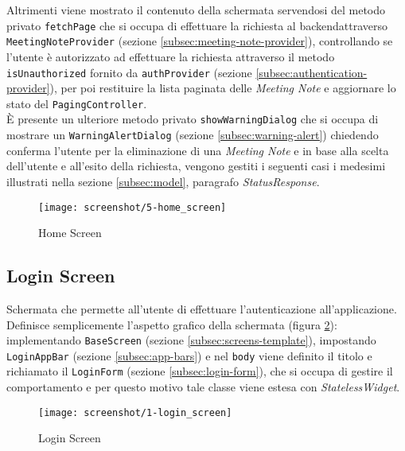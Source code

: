 Altrimenti viene mostrato il contenuto della schermata servendosi del metodo privato \lstinline{fetchPage} che si occupa di effettuare la richiesta al \gls{backend}\glsoccur attraverso \lstinline{MeetingNoteProvider} (sezione \ref{subsec:meeting-note-provider}), controllando se l'utente è autorizzato ad effettuare la richiesta attraverso il metodo \lstinline{isUnauthorized} fornito da \lstinline{authProvider} (sezione \ref{subsec:authentication-provider}), per poi restituire la lista paginata delle \emph{Meeting Note} e aggiornare lo stato del \lstinline{PagingController}. \\
È presente un ulteriore metodo privato \lstinline{showWarningDialog} che si occupa di mostrare un \lstinline{WarningAlertDialog} (sezione \ref{subsec:warning-alert}) chiedendo conferma l'utente per la eliminazione di una \emph{Meeting Note} e in base alla scelta dell'utente e all'esito della richiesta, vengono gestiti i seguenti casi {i medesimi illustrati nella sezione \ref{subsec:model}, paragrafo \emph{StatusResponse}}.

\begin{figure}[!h] 
    \centering 
    \texttt{[image: screenshot/5-home\_screen]}
    \caption{Home Screen}
    \label{fig:home-screen}
\end{figure}

\newpage
\subsection{Login Screen}
\label{subsec:login-screen}

Schermata che permette all'utente di effettuare l'autenticazione all'applicazione. \\
Definisce semplicemente l'aspetto grafico della schermata (figura \ref{fig:login-screen}): implementando \lstinline{BaseScreen} (sezione \ref{subsec:screens-template}), impostando \lstinline{LoginAppBar} (sezione \ref{subsec:app-bars}) e nel \lstinline{body} viene definito il titolo e richiamato il \lstinline{LoginForm} (sezione \ref{subsec:login-form}), che si occupa di gestire il comportamento e per questo motivo tale classe viene estesa con \emph{StatelessWidget}.

\begin{figure}[!h] 
    \centering 
    \texttt{[image: screenshot/1-login\_screen]} 
    \caption{Login Screen}
    \label{fig:login-screen}
\end{figure}

\newpage

